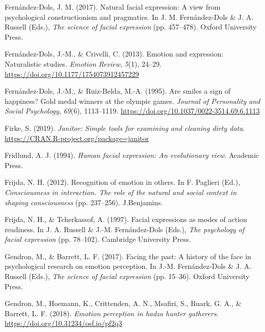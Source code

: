 \documentclass[
  english,
  man]{apa7}
\newlength{\cslhangindent}
\newenvironment{cslreferences}%
  {\setlength{\parindent}{0pt}%
  \everypar{\setlength{\hangindent}{\cslhangindent}}\ignorespaces}%
  {\par}
\begin{document}
\begin{cslreferences}
\leavevmode\hypertarget{ref-dols2017natural}{}%
Fernández-Dols, J. M. (2017). Natural facial expression: A view from psychological constructionism and pragmatics. In J. M. Fernández-Dols \& J. A. Russell (Eds.), \emph{The science of facial expression} (pp. 457--478). Oxford University Press.

\leavevmode\hypertarget{ref-fernandez2013emotion}{}%
Fernández-Dols, J.-M., \& Crivelli, C. (2013). Emotion and expression: Naturalistic studies. \emph{Emotion Review}, \emph{5}(1), 24--29. \url{https://doi.org/10.1177/1754073912457229}

\leavevmode\hypertarget{ref-fernandez1995smiles}{}%
Fernández-Dols, J.-M., \& Ruiz-Belda, M.-A. (1995). Are smiles a sign of happiness? Gold medal winners at the olympic games. \emph{Journal of Personality and Social Psychology}, \emph{69}(6), 1113--1119. \url{https://doi.org/10.1037/0022-3514.69.6.1113}

\leavevmode\hypertarget{ref-R-janitor}{}%
Firke, S. (2019). \emph{Janitor: Simple tools for examining and cleaning dirty data}. \url{https://CRAN.R-project.org/package=janitor}

\leavevmode\hypertarget{ref-fridlund1994human}{}%
Fridlund, A. J. (1994). \emph{Human facial expression: An evolutionary view}. Academic Press.

\leavevmode\hypertarget{ref-frijda2012recognition}{}%
Frijda, N. H. (2012). Recognition of emotion in others. In F. Paglieri (Ed.), \emph{Consciousness in interaction. The role of the natural and social context in shaping consciousness} (pp. 237--256). J.Benjamins.

\leavevmode\hypertarget{ref-frijda1997facial}{}%
Frijda, N. H., \& Tcherkassof, A. (1997). Facial expressions as modes of action readiness. In J. A. Russell \& J.-M. Fernández-Dols (Eds.), \emph{The psychology of facial expression} (pp. 78--102). Cambridge University Press.

\leavevmode\hypertarget{ref-gendron2017facing}{}%
Gendron, M., \& Barrett, L. F. (2017). Facing the past: A history of the face in psychological research on emotion perception. In J.-M. Fernández-Dols \& J. A. Russell (Eds.), \emph{The science of facial expression} (pp. 15--36). Oxford University Press.

\leavevmode\hypertarget{ref-gendron2018emotion}{}%
Gendron, M., Hoemann, K., Crittenden, A. N., Msafiri, S., Ruark, G. A., \& Barrett, L. F. (2018). \emph{Emotion perception in hadza hunter gatherers}. \url{https://doi.org/10.31234/osf.io/pf2q3}


\end{cslreferences}
\end{document}
